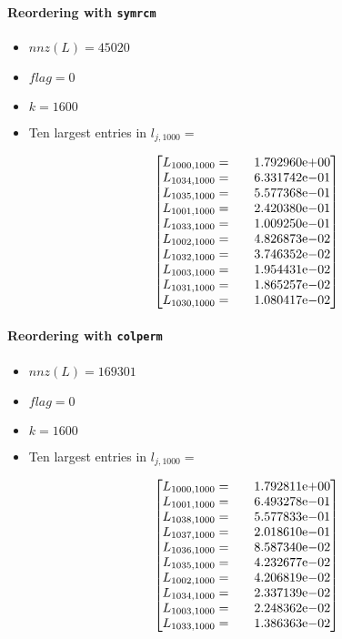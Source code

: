 \begin{enumerate}
\paragraph*{Reordering with \texttt{symrcm}}
\begin{itemize}
\item $nnz(L)= 45020$
\item $flag= 0$
\item $k= 1600$
\item Ten largest entries in $l_{j,1000}= $

$$
\begin{bmatrix}
L_{1000,1000}=  & \quad {1.792960}\mathrm{e}{+00}\\
L_{1034,1000}=  & \quad {6.331742}\mathrm{e}{-01}\\
L_{1035,1000}=  & \quad {5.577368}\mathrm{e}{-01}\\
L_{1001,1000}=  & \quad {2.420380}\mathrm{e}{-01}\\
L_{1033,1000}=  & \quad {1.009250}\mathrm{e}{-01}\\
L_{1002,1000}=  & \quad {4.826873}\mathrm{e}{-02}\\
L_{1032,1000}=  & \quad {3.746352}\mathrm{e}{-02}\\
L_{1003,1000}=  & \quad {1.954431}\mathrm{e}{-02}\\
L_{1031,1000}=  & \quad {1.865257}\mathrm{e}{-02}\\
L_{1030,1000}=  & \quad {1.080417}\mathrm{e}{-02}\\
\end{bmatrix}
$$
\end{itemize}
\newpage
\paragraph*{Reordering with \texttt{colperm}}
\begin{itemize}
\item $nnz(L)= 169301$
\item $flag= 0$
\item $k= 1600$
\item Ten largest entries in $l_{j,1000}= $

$$
\begin{bmatrix}
L_{1000,1000}=  & \quad {1.792811}\mathrm{e}{+00}\\
L_{1001,1000}=  & \quad {6.493278}\mathrm{e}{-01}\\
L_{1038,1000}=  & \quad {5.577833}\mathrm{e}{-01}\\
L_{1037,1000}=  & \quad {2.018610}\mathrm{e}{-01}\\
L_{1036,1000}=  & \quad {8.587340}\mathrm{e}{-02}\\
L_{1035,1000}=  & \quad {4.232677}\mathrm{e}{-02}\\
L_{1002,1000}=  & \quad {4.206819}\mathrm{e}{-02}\\
L_{1034,1000}=  & \quad {2.337139}\mathrm{e}{-02}\\
L_{1003,1000}=  & \quad {2.248362}\mathrm{e}{-02}\\
L_{1033,1000}=  & \quad {1.386363}\mathrm{e}{-02}\\
\end{bmatrix}
$$
\end{itemize}
\newpage

\end{enumerate}
